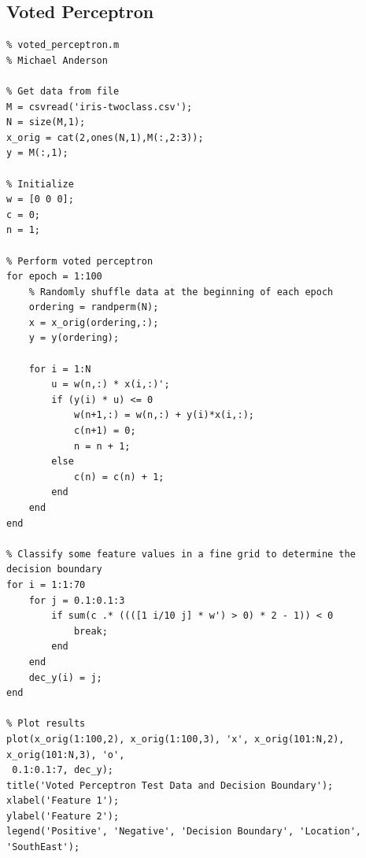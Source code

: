 \documentclass{article}
\begin{document}
\subsection{Voted Perceptron}
\begin{verbatim}
% voted_perceptron.m
% Michael Anderson

% Get data from file
M = csvread('iris-twoclass.csv');
N = size(M,1);
x_orig = cat(2,ones(N,1),M(:,2:3));
y = M(:,1);

% Initialize
w = [0 0 0];
c = 0;
n = 1;

% Perform voted perceptron
for epoch = 1:100
    % Randomly shuffle data at the beginning of each epoch
    ordering = randperm(N);
    x = x_orig(ordering,:);
    y = y(ordering);
    
    for i = 1:N
        u = w(n,:) * x(i,:)';
        if (y(i) * u) <= 0
            w(n+1,:) = w(n,:) + y(i)*x(i,:);
            c(n+1) = 0;
            n = n + 1;
        else
            c(n) = c(n) + 1;
        end
    end
end

% Classify some feature values in a fine grid to determine the decision boundary
for i = 1:1:70
    for j = 0.1:0.1:3
        if sum(c .* ((([1 i/10 j] * w') > 0) * 2 - 1)) < 0
            break;
        end
    end
    dec_y(i) = j;
end

% Plot results
plot(x_orig(1:100,2), x_orig(1:100,3), 'x', x_orig(101:N,2), x_orig(101:N,3), 'o', 
 0.1:0.1:7, dec_y);
title('Voted Perceptron Test Data and Decision Boundary');
xlabel('Feature 1');
ylabel('Feature 2');
legend('Positive', 'Negative', 'Decision Boundary', 'Location', 'SouthEast');

\end{verbatim}
\end{document}
